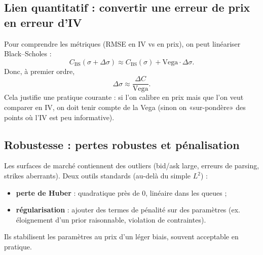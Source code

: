 \documentclass[11pt,a4paper]{report}
\theoremstyle{definition}
\theoremstyle{plain}
\theoremstyle{remark}
\newcommand{\1}{\mathbf{1}}
\begin{document}
\subsection*{Lien quantitatif : convertir une erreur de prix en erreur d'IV}
Pour comprendre les métriques (RMSE en IV vs en prix), on peut linéariser Black--Scholes :
\[
C_{\text{BS}}(\sigma+\Delta\sigma)\approx C_{\text{BS}}(\sigma)+\text{Vega}\cdot \Delta\sigma.
\]
Donc, à premier ordre,
\[
\Delta\sigma \approx \frac{\Delta C}{\text{Vega}}.
\]
Cela justifie une pratique courante : si l'on calibre en prix mais que l'on veut comparer en IV, on doit tenir compte de la Vega (sinon on «sur-pondère» des points où l'IV est peu informative).

\subsection*{Robustesse : pertes robustes et pénalisation}
Les surfaces de marché contiennent des outliers (bid/ask large, erreurs de parsing, strikes aberrants).
Deux outils standards (au-delà du simple $L^2$) :
\begin{itemize}[leftmargin=*]
\item \textbf{perte de Huber} : quadratique près de 0, linéaire dans les queues ;
\item \textbf{régularisation} : ajouter des termes de pénalité sur des paramètres (ex. éloignement d'un prior raisonnable, violation de contraintes).
\end{itemize}
Ils stabilisent les paramètres au prix d'un léger biais, souvent acceptable en pratique.


\end{document}
